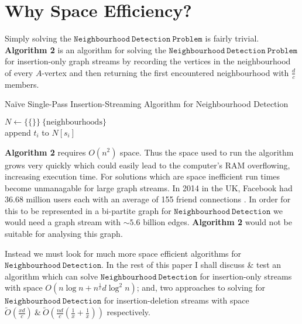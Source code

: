 \documentclass[11pt,twoside,a4paper]{report}
\begin{document}
\section{Why Space Efficiency?}
Simply solving the $\mathtt{Neighbourhood\ Detection\ Problem}$ is fairly trivial. \textbf{Algorithm 2} is an algorithm for solving the $\mathtt{Neighbourhood\ Detection\ Problem}$ for insertion-only graph streams by recording the vertices in the neighbourhood of every $A$-vertex and then returning the first encountered neighbourhood with $\frac{d}{c}$ members.\\
\begin{algorithm}[H]
\caption{Na\"ive Single-Pass Insertion-Streaming Algorithm for Neighbourhood Detection}
$N\leftarrow\{\{\}\}\ \{\text{neighbourhoods}\}$\\
 {
	append $t_i$ to $N[s_i]$\\
	 {
	}
}
\end{algorithm}
\par\textbf{Algorithm 2} requires $O\left(n^2\right)$ space. Thus the space used to run the algorithm grows very quickly which could easily lead to the computer's RAM overflowing, increasing execution time. 
For solutions which are space inefficient run times become unmanagable for large graph streams. In 2014 in the UK, Facebook had 36.68 million users \cite{users16} each with an average of 155 friend connections \cite{friends16}. In order for this to be represented in a bi-partite graph for $\mathtt{Neighbourhood\ Detection}$ we would need a graph stream with ${\sim}5.6$ billion edges. \textbf{Algorithm 2} would not be suitable for analysing this graph.
\par Instead we must look for much more space efficient algorithms for\\
$\mathtt{Neighbourhood\ Detection}$. In the rest of this paper I shall discuss \& test an algorithm which can solve $\mathtt{Neighbourhood\ Detection}$ for insertion-only streams with space $O(n\log n+n^{\frac1c}d\log^2n)$; and, two approaches to solving for $\mathtt{Neighbourhood\ Detection}$ for insertion-deletion streams with space $\tilde O\left(\frac{xd}{c}\right)\ \&\ \tilde O\left(\frac{nd}{c}\left(\frac1x+\frac1x\right)\right)$ respectively.
\end{document}
